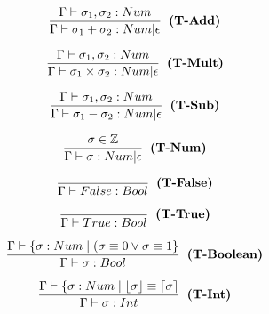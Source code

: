 \begin{minipage}[c]{0.3\textwidth}
    \[
    \frac{\Gamma\vdash\sigma_1, \sigma_2 :Num}
    {\Gamma\vdash \sigma_1 + \sigma_2: Num|\epsilon} \hspace{0.2cm} \textbf{(T-Add)}
    \]
\end{minipage}
\hfill
\begin{minipage}[c]{0.3\textwidth}
    \[
    \frac{\Gamma\vdash\sigma_1, \sigma_2 :Num}
    {\Gamma\vdash \sigma_1 \times \sigma_2: Num|\epsilon} \hspace{0.2cm} \textbf{(T-Mult)}
    \]
\end{minipage}
\hfill
\hfill
\begin{minipage}[c]{0.3\textwidth}
    \[
    \frac{\Gamma\vdash\sigma_1, \sigma_2 :Num}
    {\Gamma\vdash \sigma_1 - \sigma_2: Num|\epsilon} \hspace{0.2cm} \textbf{(T-Sub)}
    \]
\end{minipage}



\begin{minipage}[c]{0.1\textwidth}
    \[
    \frac{\sigma \in \mathbb{Z}}
    {\Gamma\vdash \sigma: Num|\epsilon} \hspace{0.2cm} \textbf{(T-Num)}
    \]
\end{minipage}
\hfill
\begin{minipage}[c]{0.1\textwidth}
  \[
  \frac{}
  {\Gamma\vdash False: Bool} \hspace{0.2cm} \textbf{(T-False)}
  \]
\end{minipage}
\hfill
\begin{minipage}[c]{0.27\textwidth}
  \[
  \frac{}
  {\Gamma\vdash True: Bool} \hspace{0.2cm} \textbf{(T-True)}
  \]
\end{minipage}

\begin{minipage}[c]{0.1\textwidth}
\[
\frac{\Gamma\vdash\{\sigma: Num\hspace{0.1cm}|\hspace{0.1cm}(\sigma\equiv 0 \vee \sigma\equiv 1 \}}
{\Gamma\vdash \sigma: Bool} \hspace{0.2cm} \textbf{(T-Boolean)}
\]
\end{minipage}
\hfill
\begin{minipage}[c]{0.35\textwidth}
\[
\frac{\Gamma\vdash\{\sigma: Num\hspace{0.1cm}|\hspace{0.1cm} \lfloor \sigma \rfloor \equiv \lceil \sigma \rceil}
{\Gamma\vdash \sigma: Int} \hspace{0.2cm} \textbf{(T-Int)}
\]
\end{minipage}
\hfill

